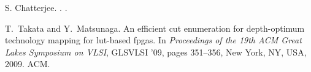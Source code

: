 \documentclass[journal]{IEEEtran}
\begin{document}
\begin{thebibliography}{10}
{S. Chatterjee}.
.
.

T.~Takata and Y.~Matsunaga.
\newblock An efficient cut enumeration for depth-optimum technology mapping for
  lut-based fpgas.
\newblock In {\em Proceedings of the 19th ACM Great Lakes Symposium on VLSI},
  GLSVLSI '09, pages 351--356, New York, NY, USA, 2009. ACM.

\end{thebibliography}
\end{document}
